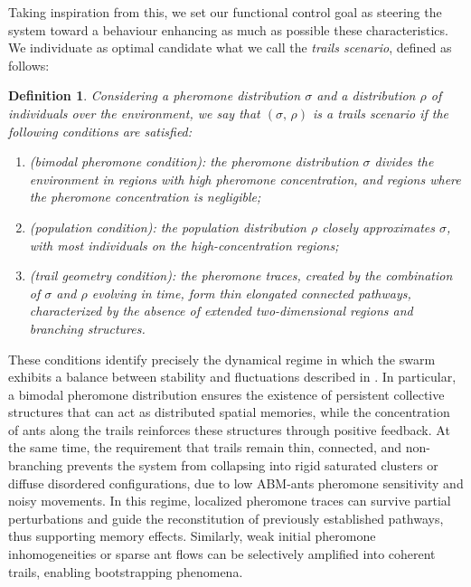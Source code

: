 \documentclass[pdflatex,sn-mathphys-num]{sn-jnl}%
\theoremstyle{thmstyleone}%
\theoremstyle{thmstyletwo}%
\theoremstyle{thmstylethree}%
\newtheorem{definition}{Definition}%
\begin{document}
Taking inspiration from this, we set our functional control goal as steering the system toward a behaviour enhancing as much as possible these characteristics. We individuate as optimal candidate what we call the \emph{trails scenario}, defined as follows:
\begin{definition}
\label{def:ants-trail-scenario}
Considering a pheromone distribution $\sigma$ and a distribution $\rho$ of individuals over the environment, we say that $(\sigma, \, \rho)$ is a \emph{trails scenario} if the following conditions are satisfied:
\begin{enumerate}
    \item (\textit{bimodal pheromone condition}): the pheromone distribution $\sigma$ divides the environment in regions with high pheromone concentration, and regions where the pheromone concentration is negligible;

    \item (\textit{population condition}): the population distribution $\rho$ closely approximates $\sigma$, with most individuals on the high-concentration regions;

    \item (\textit{trail geometry condition}): the pheromone traces, created by the combination of $\sigma$ and $\rho$ evolving in time, form thin elongated connected pathways, characterized by the absence of extended two-dimensional regions and branching structures.
\end{enumerate}
\end{definition}
These conditions identify precisely the dynamical regime in which the swarm exhibits a balance between stability and fluctuations described in \cite{patternformation}. In particular, a bimodal pheromone distribution ensures the existence of persistent collective structures that can act as distributed spatial memories, while the concentration of ants along the trails reinforces these structures through positive feedback. At the same time, the requirement that trails remain thin, connected, and non-branching prevents the system from collapsing into rigid saturated clusters or diffuse disordered configurations, due to low ABM-ants pheromone sensitivity and noisy movements. In this regime, localized pheromone traces can survive partial perturbations and guide the reconstitution of previously established pathways, thus supporting memory effects. Similarly, weak initial pheromone inhomogeneities or sparse ant flows can be selectively amplified into coherent trails, enabling bootstrapping phenomena. 
\end{document}
